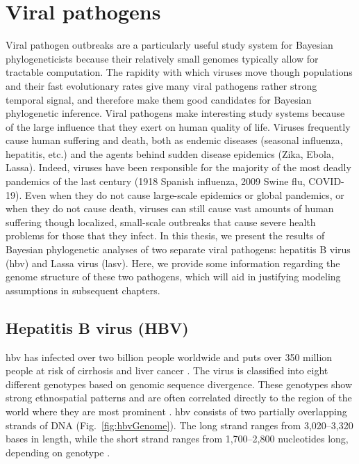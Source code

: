 \section{Viral pathogens}
Viral pathogen outbreaks are a particularly useful study system for Bayesian phylogeneticists because their relatively small genomes typically allow for tractable computation.
The rapidity with which viruses move though populations and their fast evolutionary rates give many viral pathogens rather strong temporal signal, and therefore make them good candidates for Bayesian phylogenetic inference.
Viral pathogens make interesting study systems because of the large influence that they exert on human quality of life.
Viruses frequently cause human suffering and death, both as endemic diseases (seasonal influenza, hepatitis, etc.) and the agents behind sudden disease epidemics (Zika, Ebola, Lassa).
Indeed, viruses have been responsible for the majority of the most deadly pandemics of the last century (1918 Spanish influenza, 2009 Swine flu, COVID-19).
Even when they do not cause large-scale epidemics or global pandemics, or when they do not cause death, viruses can still cause vast amounts of human suffering though localized, small-scale outbreaks that cause severe health problems for those that they infect.
In this thesis, we present the results of Bayesian phylogenetic analyses of two separate viral pathogens: hepatitis B virus (\gls{hbv}) and Lassa virus (\gls{lasv}).
Here, we provide some information regarding the genome structure of these two pathogens, which will aid in justifying modeling assumptions in subsequent chapters.


\subsection{Hepatitis B virus (HBV)}

\gls{hbv} has infected over two billion people worldwide and puts over 350 million people at risk of cirrhosis and liver cancer \cite{kane1995global}.
The virus is classified into eight different genotypes based on genomic sequence divergence.
These genotypes show strong ethnospatial patterns and are often correlated directly to the region of the world where they are most prominent \cite{schaefer2007hepatitis}.
\gls{hbv} consists of two partially overlapping strands of DNA (Fig.~\ref{fig:hbvGenome}).
The long strand ranges from 3,020--3,320 bases in length, while the short strand ranges from 1,700--2,800 nucleotides long, depending on genotype \cite{kay2007hepatitis}.

